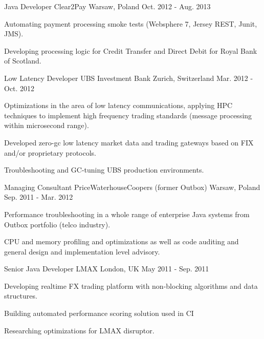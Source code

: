 \begin{cventries}
  \cventry
    {Java Developer} %
    {Clear2Pay} %
    {Warsaw, Poland} %
    {Oct. 2012 - Aug. 2013} %
    {
      \begin{cvitems} %
        \item {Automating payment processing smoke tests (Websphere 7, Jersey REST, Junit, JMS).}
        \item {Developing processing logic for Credit Transfer and Direct Debit for Royal Bank of Scotland.}
      \end{cvitems}
    }

  \cventry
    {Low Latency Developer} %
    {UBS Investment Bank} %
    {Zurich, Switzerland} %
    {Mar. 2012 - Oct. 2012} %
    {
      \begin{cvitems} %
        \item {Optimizations in the area of low latency communications, applying HPC techniques to implement high frequency trading standards (message processing within microsecond range).}
        \item {Developed zero-gc low latency market data and trading gateways based on FIX and/or proprietary protocols.}
        \item {Troubleshooting and GC-tuning UBS production environments.}
      \end{cvitems}
    }

  \cventry
    {Managing Consultant} %
    {PriceWaterhouseCoopers (former Outbox)} %
    {Warsaw, Poland} %
    {Sep. 2011 - Mar. 2012} %
    {
      \begin{cvitems} %
        \item {Performance troubleshooting in a whole range of enterprise Java systems from Outbox portfolio (telco industry).}
        \item {CPU and memory profiling and optimizations as well as code auditing and general design and implementation level advisory.}
      \end{cvitems}
    }

  \cventry
    {Senior Java Developer} %
    {LMAX} %
    {London, UK} %
    {May 2011 - Sep. 2011} %
    {
      \begin{cvitems} %
        \item {Developing realtime FX trading platform with non-blocking algorithms and data structures.}
        \item {Building automated performance scoring solution used in CI}
        \item {Researching optimizations for LMAX disruptor.}
      \end{cvitems}
    }


\end{cventries}
